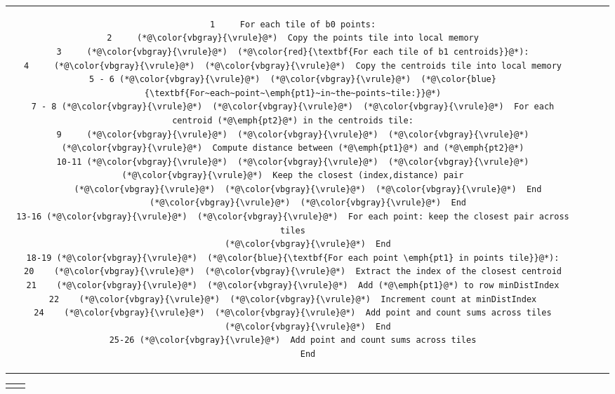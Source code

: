 \begin{tabular}{cm{}m{}m{}}
{\begin{lstlisting}[numbers=none,language=Pseudo]
1     For each tile of b0 points:
2     (*@\color{vbgray}{\vrule}@*)  Copy the points tile into local memory
3     (*@\color{vbgray}{\vrule}@*)  (*@\color{red}{\textbf{For each tile of b1 centroids}}@*):
4     (*@\color{vbgray}{\vrule}@*)  (*@\color{vbgray}{\vrule}@*)  Copy the centroids tile into local memory
5 - 6 (*@\color{vbgray}{\vrule}@*)  (*@\color{vbgray}{\vrule}@*)  (*@\color{blue}{\textbf{For~each~point~\emph{pt1}~in~the~points~tile:}}@*)
7 - 8 (*@\color{vbgray}{\vrule}@*)  (*@\color{vbgray}{\vrule}@*)  (*@\color{vbgray}{\vrule}@*)  For each centroid (*@\emph{pt2}@*) in the centroids tile:
9     (*@\color{vbgray}{\vrule}@*)  (*@\color{vbgray}{\vrule}@*)  (*@\color{vbgray}{\vrule}@*)  (*@\color{vbgray}{\vrule}@*)  Compute distance between (*@\emph{pt1}@*) and (*@\emph{pt2}@*)
10-11 (*@\color{vbgray}{\vrule}@*)  (*@\color{vbgray}{\vrule}@*)  (*@\color{vbgray}{\vrule}@*)  (*@\color{vbgray}{\vrule}@*)  Keep the closest (index,distance) pair
      (*@\color{vbgray}{\vrule}@*)  (*@\color{vbgray}{\vrule}@*)  (*@\color{vbgray}{\vrule}@*)  End
      (*@\color{vbgray}{\vrule}@*)  (*@\color{vbgray}{\vrule}@*)  End
13-16 (*@\color{vbgray}{\vrule}@*)  (*@\color{vbgray}{\vrule}@*)  For each point: keep the closest pair across tiles
      (*@\color{vbgray}{\vrule}@*)  End
18-19 (*@\color{vbgray}{\vrule}@*)  (*@\color{blue}{\textbf{For each point \emph{pt1} in points tile}}@*):
20    (*@\color{vbgray}{\vrule}@*)  (*@\color{vbgray}{\vrule}@*)  Extract the index of the closest centroid
21    (*@\color{vbgray}{\vrule}@*)  (*@\color{vbgray}{\vrule}@*)  Add (*@\emph{pt1}@*) to row minDistIndex
22    (*@\color{vbgray}{\vrule}@*)  (*@\color{vbgray}{\vrule}@*)  Increment count at minDistIndex
24    (*@\color{vbgray}{\vrule}@*)  (*@\color{vbgray}{\vrule}@*)  Add point and count sums across tiles
      (*@\color{vbgray}{\vrule}@*)  End
25-26 (*@\color{vbgray}{\vrule}@*)  Add point and count sums across tiles
      End
\end{lstlisting}}
\end{tabular}


\vspace{-0.2in}\begin{tabular}{cc}
{\parbox{0.45\textwidth}{}} &
{\parbox{0.5\textwidth}{}}
\end{tabular}

